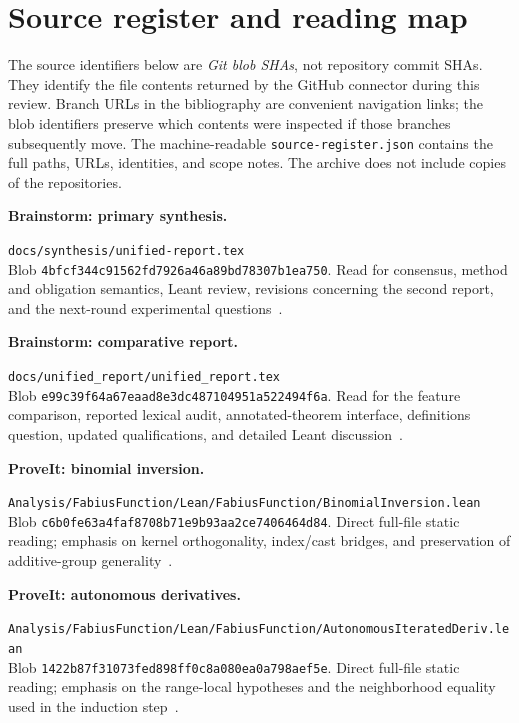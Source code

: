 \documentclass[11pt,letterpaper]{article}
\newcommand{\code}[1]{\nolinkurl{#1}}
\theoremstyle{definition}
\theoremstyle{remark}
\begin{document}
\section{Source register and reading map}
\label{app:sources}

The source identifiers below are \emph{Git blob SHAs}, not repository commit
SHAs. They identify the file contents returned by the GitHub connector during
this review. Branch URLs in the bibliography are convenient navigation links;
the blob identifiers preserve which contents were inspected if those branches
subsequently move. The machine-readable \code{source-register.json} contains
the full paths, URLs, identities, and scope notes. The archive does not include
copies of the repositories.


\textbf{Brainstorm: primary synthesis.}\par
\code{docs/synthesis/unified-report.tex}\\
Blob \code{4bfcf344c91562fd7926a46a89bd78307b1ea750}. Read for consensus,
method and obligation semantics, Leant review, revisions concerning the second
report, and the next-round experimental questions~\cite{synthesis}.

\textbf{Brainstorm: comparative report.}\par
\code{docs/unified_report/unified_report.tex}\\
Blob \code{e99c39f64a67eaad8e3dc487104951a522494f6a}. Read for the feature
comparison, reported lexical audit, annotated-theorem interface, definitions
question, updated qualifications, and detailed Leant discussion~\cite{blueprints}.

\textbf{ProveIt: binomial inversion.}\par
\code{Analysis/FabiusFunction/Lean/FabiusFunction/BinomialInversion.lean}\\
Blob \code{c6b0fe63a4faf8708b71e9b93aa2ce7406464d84}. Direct full-file static
reading; emphasis on kernel orthogonality, index/cast bridges, and preservation
of additive-group generality~\cite{p-binomial}.

\textbf{ProveIt: autonomous derivatives.}\par
\code{Analysis/FabiusFunction/Lean/FabiusFunction/AutonomousIteratedDeriv.lean}\\
Blob \code{1422b87f31073fed898ff0c8a080ea0a798aef5e}. Direct full-file static
reading; emphasis on the range-local hypotheses and the neighborhood equality
used in the induction step~\cite{p-ode}.
\end{document}
